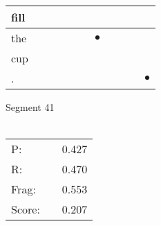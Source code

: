 \documentclass[landscape]{article}
\newcommand{\ssp}{\hspace{2pt}}
\newcommand{\mex}{\cellcolor{g}$\bullet$}
\begin{document}
\begin{tabular}{|l|p{10pt}|p{10pt}|p{10pt}|p{10pt}|p{10pt}|p{10pt}|p{10pt}|p{10pt}|p{10pt}|p{10pt}|}
\hline
\ssp fill \ssp&\hspace{2pt}&\hspace{2pt}&\hspace{2pt}&\hspace{2pt}&\hspace{2pt}&\hspace{2pt}&\hspace{2pt}&\hspace{2pt}&\hspace{2pt}&\hspace{2pt}\\
\hline
\ssp \cellcolor{ref5}the \ssp&\hspace{2pt}&\hspace{2pt}&\hspace{2pt}&\hspace{2pt}&\hspace{2pt}&\hspace{2pt}\mex&\hspace{2pt}&\hspace{2pt}&\hspace{2pt}&\hspace{2pt}\\
\hline
\ssp cup \ssp&\hspace{2pt}&\hspace{2pt}&\hspace{2pt}&\hspace{2pt}&\hspace{2pt}&\hspace{2pt}&\hspace{2pt}&\hspace{2pt}&\hspace{2pt}&\hspace{2pt}\\
\hline
\ssp \cellcolor{ref9}. \ssp&\hspace{2pt}&\hspace{2pt}&\hspace{2pt}&\hspace{2pt}&\hspace{2pt}&\hspace{2pt}&\hspace{2pt}&\hspace{2pt}&\hspace{2pt}&\hspace{2pt}\mex\\
\hline
\end{tabular}

\vspace{6pt}
\noindent Segment 41\\\\
\noindent\begin{tabular}{lm{12pt}r}
\hline
P:&&0.427\\
R:&&0.470\\
Frag:&&0.553\\
Score:&&0.207\\
\end{tabular}
\end{document}
